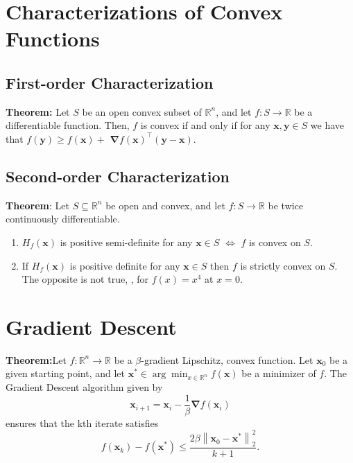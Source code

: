\section{Characterizations of Convex Functions}

\subsection{First-order Characterization}
\textbf{Theorem:}
Let $S$ be an open convex subset of $\mathbb{R}^{n}$, and let $f: S \rightarrow \mathbb{R}$ be a differentiable function. Then, $f$ is convex if and only if for any $\boldsymbol{x}, \boldsymbol{y} \in S$ we have that $f(\boldsymbol{y}) \geq f(\boldsymbol{x})+$ $\boldsymbol{\nabla} f(\boldsymbol{x})^{\top}(\boldsymbol{y}-\boldsymbol{x}) .$

\subsection{Second-order Characterization}
\textbf{Theorem}:
Let $S \subseteq \mathbb{R}^{n}$ be open and convex, and let $f: S \rightarrow \mathbb{R}$ be twice continuously differentiable.
\begin{enumerate}
    \item $H_{f}(\boldsymbol{x})$ is positive semi-definite for any $\boldsymbol{x} \in S$ $\Leftrightarrow$ $f$ is convex on $S$.
    \item If $H_{f}(\boldsymbol{x})$ is positive definite for any $\boldsymbol{x} \in S$ then $f$ is strictly convex on $S$. The opposite is not true, \eg, for $f(x)=x^4$ at $x=0$.
\end{enumerate}

\section{Gradient Descent}

\textbf{Theorem:}Let $f: \mathbb{R}^{n} \rightarrow \mathbb{R}$ be a $\beta$-gradient Lipschitz, convex function. Let $\boldsymbol{x}_{0}$ be a given starting point, and let $\boldsymbol{x}^{*} \in \arg \min _{x \in \mathbb{R}^{n}} f(\boldsymbol{x})$ be a minimizer of $f$. The Gradient Descent algorithm given by
$$
\boldsymbol{x}_{i+1}=\boldsymbol{x}_{i}-\frac{1}{\beta} \boldsymbol{\nabla} f\left(\boldsymbol{x}_{i}\right)
$$
ensures that the kth iterate satisfies
$$
f\left(\boldsymbol{x}_{k}\right)-f\left(\boldsymbol{x}^{*}\right) \leq \frac{2 \beta\left\|\boldsymbol{x}_{0}-\boldsymbol{x}^{*}\right\|_{2}^{2}}{k+1} .
$$

